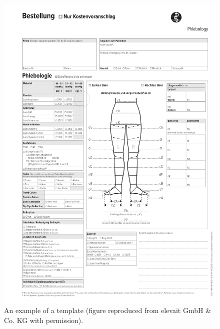 \begin{figure}
  \centering
  \begin{minipage}[b]{0.4\textwidth}
  	\includegraphics[width=\textwidth]{images/Introduction/template.png}
    	\caption[An example of a template.]{An example of a template (figure reproduced from elevait GmbH \& Co. KG with permission).}
    	\label{fig:exampleTemplate}
    

\end{minipage}
\end{figure}
